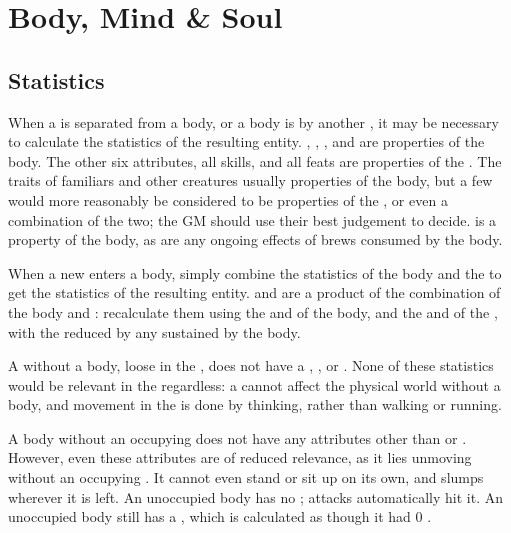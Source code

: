 \chapter{Body, Mind \& Soul}

\section{Statistics}

When a {\mind} is separated from a body, or a body is {\possessed} by another {\mind}, it may be necessary to calculate the statistics of the resulting entity.
, , , and  are properties of the body.
The other six attributes, all skills, and all feats are properties of the {\mind}.
The traits of familiars and other creatures usually properties of the body, but a few would more reasonably be considered to be properties of the {\mind}, or even a combination of the two; the GM should use their best judgement to decide.
\capital{\damage} is a property of the body, as are any ongoing effects of brews consumed by the body.

When a new {\mind} enters a body, simply combine the statistics of the body and the {\mind} to get the statistics of the resulting entity.
 and  are a product of the combination of the body and {\mind}: recalculate them using the  and  of the body, and the  and  of the {\mind}, with the  reduced by any {\damage} sustained by the body.

A {\mind} without a body, loose in the {\mentalrealm}, does not have a , , or .
None of these statistics would be relevant in the {\mentalrealm} regardless: a {\mind} cannot affect the physical world without a body, and movement in the {\mentalrealm} is done by thinking, rather than walking or running.

A body without an occupying {\mind} does not have any attributes other than  or .
However, even these attributes are of reduced relevance, as it lies unmoving without an occupying {\mind}.
It cannot even stand or sit up on its own, and slumps wherever it is left.
An unoccupied body has no ; attacks automatically hit it.
An unoccupied body still has a , which is calculated as though it had 0 .
